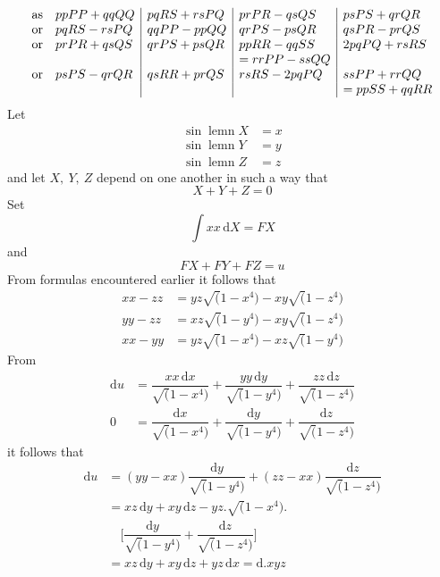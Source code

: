 \begingroup\small\setlength{\arraycolsep}{4pt}\[
\begin{array}{@{}ll|l|l|l@{}}
\text{as}&ppPP+qqQQ&pqRS+rsPQ&prPR-qsQS&psPS+qrQR\\
\text{or}&pqRS-rsPQ&qqPP-ppQQ&qrPS-psQR&qsPR-prQS\\
\text{or}&prPR+qsQS&qrPS+psQR&ppRR-qqSS&2pqPQ+rsRS\\
&&&=rrPP-ssQQ&\\
\text{or}&psPS-qrQR&qsRR+prQS&rsRS-2pqPQ&ssPP+rrQQ\\
&&&&=ppSS+qqRR
\end{array}
\]\endgroup
{}
\noindent Let
\[
\begin{aligned}
\sin\operatorname{lemn}X&=x\\[5pt]
\sin\operatorname{lemn}Y&=y\\[5pt]
\sin\operatorname{lemn}Z&=z
\end{aligned}
\]
\noindent and let $X,\ Y,\ Z$ depend on one another in such a way that
\[
X+Y+Z=0
\]
\noindent Set
\[
\int xx\,\mathrm{d}X=FX
\]
\noindent and
\[
FX+FY+FZ=u
\]
\noindent From formulas encountered earlier it follows that
\[
\begin{aligned}
xx-zz&=yz\surd(1-x^4)-xy\surd(1-z^4)\\[5pt]
yy-zz&=xz\surd(1-y^4)-xy\surd(1-z^4)\\[5pt]
xx-yy&=yz\surd(1-x^4)-xz\surd(1-y^4)
\end{aligned}
\]
\noindent From
\[
\begin{aligned}
\mathrm{d}u&=\dfrac{xx\,\mathrm{d}x}{\surd(1-x^4)}
+\dfrac{yy\,\mathrm{d}y}{\surd(1-y^4)}
+\dfrac{zz\,\mathrm{d}z}{\surd(1-z^4)}\\[5pt]
0&=\dfrac{\mathrm{d}x}{\surd(1-x^4)}
+\dfrac{\mathrm{d}y}{\surd(1-y^4)}
+\dfrac{\mathrm{d}z}{\surd(1-z^4)}
\end{aligned}
\]
\noindent it follows that
\[
\begin{aligned}
\mathrm{d}u&=(yy-xx)\dfrac{\mathrm{d}y}{\surd(1-y^4)}
+(zz-xx)\dfrac{\mathrm{d}z}{\surd(1-z^4)}\\[5pt]
&=xz\,\mathrm{d}y+xy\,\mathrm{d}z-yz.\surd(1-x^4).
\\[7pt]&\quad{}\biggl[\dfrac{\mathrm{d}y}{\surd(1-y^4)}+\dfrac{\mathrm{d}z}{\surd(1-z^4)}\biggr]\\[5pt]
&=xz\,\mathrm{d}y+xy\,\mathrm{d}z+yz\,\mathrm{d}x=\mathrm{d}.xyz
\end{aligned}
\]

